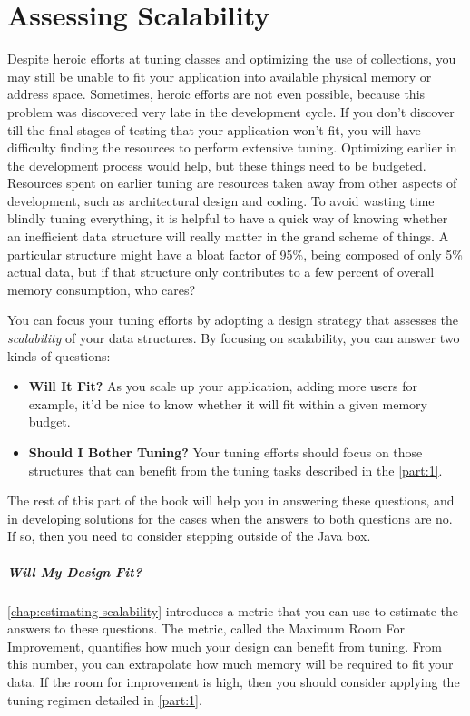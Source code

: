 \chapter{Assessing Scalability}
\label{chapter:scalability-intro}

Despite heroic efforts at tuning classes and optimizing the use of collections,
you may still be unable to fit your application into available physical memory
or address space. Sometimes, heroic efforts are not even possible, because this
problem was discovered very late in the development cycle. If you don't discover
till the final stages of testing that your application won't fit, you will have
difficulty finding the resources to perform extensive tuning. Optimizing earlier
in the development process would help, but these things need to be budgeted.
Resources spent on earlier tuning are resources taken away from other aspects of
development, such as architectural design and coding. To avoid wasting time
blindly tuning everything, it is helpful to have a quick way of knowing whether
an inefficient data structure will really matter in the grand scheme of things.
A particular structure might have a bloat factor of 95\%, being composed of only
5\% actual data, but if that structure only contributes to a few percent of
overall memory consumption, who cares?

You can focus your tuning efforts by adopting a design strategy that assesses
the \emph{scalability} of your data structures. By focusing on scalability, you
can answer two kinds of questions:

\begin{itemize}
  \item \textbf{Will It Fit?} As you scale up your application, adding more
  users for example, it'd be nice to know whether it will fit
  within a given memory budget. 
  \item \textbf{Should I Bother Tuning?} Your tuning efforts should focus 
on those structures that can benefit from the tuning tasks described in
the \autoref{part:1}. 
\end{itemize}

The rest of this part of the book will help you in answering these
questions, and in developing solutions for the cases when the answers to both
questions are no. If so, then you need to consider stepping outside of the Java
box.

\paragraph{Will My Design Fit?}
\autoref{chap:estimating-scalability} introduces a metric that you can use to
estimate the answers to these questions. The metric, called the  Maximum Room
For Improvement, quantifies how much your design can benefit from tuning. From
this number, you can extrapolate how much memory will be required to fit your
data. If the room for improvement is high, then you should consider
applying the tuning regimen detailed in \autoref{part:1}.

